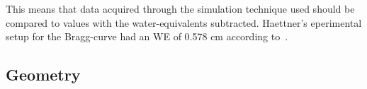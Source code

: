 This means that data acquired through the simulation technique used should be compared to values with the water-equivalents subtracted. Haettner's eperimental setup for the Bragg-curve had an WE of 0.578 cm according to~\cite[table 4.1]{ehaettner}.



\subsection{Geometry}





\begin{figure}[!ht]
\centering
{}
\label{fig:EHaettnerDataForAEDistrib1}

\end{figure}
